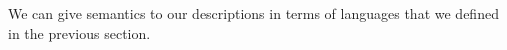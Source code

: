We can give semantics to our descriptions in terms of languages that we defined in the previous section.

\begin{code}%
%
\>[4]\AgdaSpace{}%
\AgdaSymbol{:}\AgdaSpace{}%
\AgdaSpace{}%
\AgdaSpace{}%
\AgdaSpace{}%
\AgdaSpace{}%
\<%
\\
%
\>[4]\AgdaSpace{}%
\AgdaSpace{}%
%
\>[18]\AgdaSymbol{=}\AgdaSpace{}%
\AgdaSpace{}%
\<%
\\
%
\>[4]\AgdaSpace{}%
\AgdaSpace{}%
%
\>[18]\AgdaSymbol{=}\AgdaSpace{}%
\AgdaSpace{}%
\<%
\\
%
\>[4]\AgdaSpace{}%
\AgdaSpace{}%
\AgdaSpace{}%
%
\>[18]\AgdaSymbol{=}\AgdaSpace{}%
\AgdaSpace{}%
\AgdaSymbol{(}\AgdaSpace{}%
\AgdaSymbol{)}\<%
\\
%
\>[4]\AgdaSpace{}%
\AgdaSpace{}%
\AgdaSpace{}%
\AgdaSpace{}%
\AgdaSpace{}%
%
\>[20]\AgdaSymbol{=}\AgdaSpace{}%
\AgdaSpace{}%
\AgdaSpace{}%
\AgdaSpace{}%
\AgdaSpace{}%
\AgdaSpace{}%
\AgdaSpace{}%
\AgdaSpace{}%
\AgdaSpace{}%
\<%
\\
%
\>[4]\AgdaSpace{}%
\AgdaSpace{}%
\AgdaSpace{}%
\AgdaSpace{}%
\AgdaSpace{}%
%
\>[20]\AgdaSymbol{=}\AgdaSpace{}%
\AgdaSpace{}%
\AgdaSpace{}%
\AgdaSpace{}%
\AgdaSpace{}%
\AgdaSpace{}%
\AgdaSpace{}%
\AgdaSpace{}%
\AgdaSpace{}%

\end{code}
